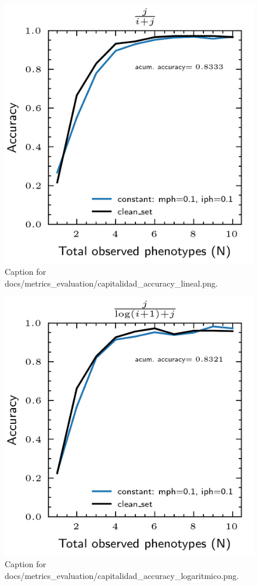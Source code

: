 \documentclass{article}
\begin{document}
\begin{figure}[h] \centering \includegraphics{docs/metrics_evaluation/capitalidad_accuracy_lineal.png} \caption{Caption for docs/metrics_evaluation/capitalidad_accuracy_lineal.png.} \end{figure}
\begin{figure}[h] \centering \includegraphics{docs/metrics_evaluation/capitalidad_accuracy_logaritmico.png} \caption{Caption for docs/metrics_evaluation/capitalidad_accuracy_logaritmico.png.} \end{figure}
\end{document}
